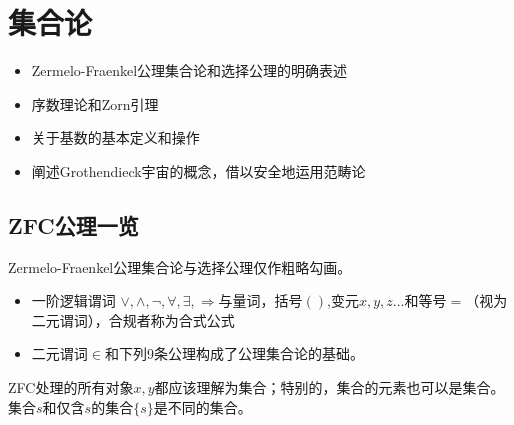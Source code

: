 \chapter{集合论}


\begin{itemize}
    \item Zermelo-Fraenkel公理集合论和选择公理的明确表述
    \item 序数理论和Zorn引理 
    \item 关于基数的基本定义和操作
    \item 阐述Grothendieck宇宙的概念，借以安全地运用范畴论 
\end{itemize}

\section{ZFC公理一览}
    Zermelo-Fraenkel公理集合论与选择公理仅作粗略勾画。
\begin{itemize}
    \item 一阶逻辑谓词 $\vee, \wedge, \lnot, \forall ,\exists, \Rightarrow $与量词，括号$()$,变元$x,y,z ...$和等号$=$（视为二元谓词），合规者称为合式公式
    \item 二元谓词$\in$和下列9条公理构成了公理集合论的基础。
\end{itemize}
    ZFC处理的所有对象$x,y$都应该理解为集合；特别的，集合的元素也可以是集合。集合$s$和仅含$s$的集合$\{s\}$是不同的集合。

